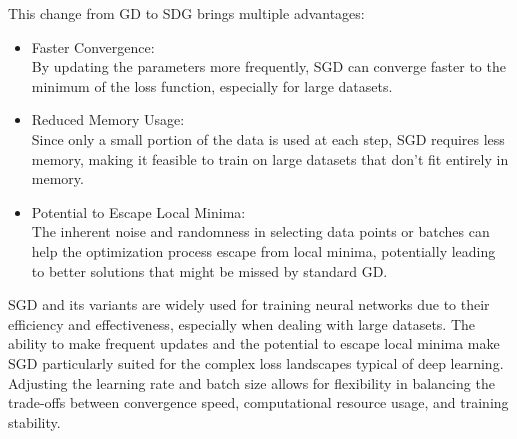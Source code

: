 \documentclass[oneside]{article}
\begin{document}
This change from GD to SDG brings multiple advantages:
\begin{itemize}
    \item Faster Convergence: \\
    By updating the parameters more frequently, SGD can converge faster to the minimum of the loss function, especially for large datasets.
    \item Reduced Memory Usage: \\
    Since only a small portion of the data is used at each step, SGD requires less memory, making it feasible to train on large datasets that don't fit entirely in memory.
    \item Potential to Escape Local Minima: \\
    The inherent noise and randomness in selecting data points or batches can help the optimization process escape from local minima, potentially leading to better solutions that might be missed by standard GD.
\end{itemize}
SGD and its variants are widely used for training neural networks due to their efficiency and effectiveness, especially when dealing with large datasets. The ability to make frequent updates and the potential to escape local minima make SGD particularly suited for the complex loss landscapes typical of deep learning. Adjusting the learning rate and batch size allows for flexibility in balancing the trade-offs between convergence speed, computational resource usage, and training stability.
\end{document}
